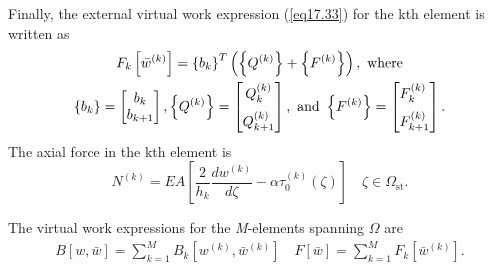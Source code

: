 \documentclass{AeroStructure-ERJohnson}
\begin{document}
Finally, the external virtual work expression (\ref{eq17.33}) for the kth element is written as
\begin{gather}
F_{k}\left[\bar{w}^{(k)}\right]=\left\{b_{k}\right\}^{T}\left(\left\{Q^{(k)}\right\}+\left\{F^{(k)}\right\}\right), \textrm{ where}\label{eq17.36} \\
\left\{b_{k}\right\}=\left[\begin{array}{@{}c@{}}b_{k} \\b_{k+1}\end{array}\right], \left\{Q^{(k)}\right\}=\left[\begin{array}{@{}c@{}}Q_{k}^{(k)} \\[6pt] Q_{k+1}^{(k)}\end{array}\right], \textrm{ and } \left\{F^{(k)}\right\}=\left[\begin{array}{@{}l@{}}F_{k}^{(k)} \\[6pt] F_{k+1}^{(k)}\end{array}\right]. \label{eq17.37}
\end{gather}
The axial force in the kth element is
\begin{equation}
N^{(k)}=E A\left[\frac{2}{h_{k}} \frac{d w^{(k)}}{d \zeta}-\alpha \tau_{0}^{(k)}(\zeta)\right] \quad \zeta \in \Omega_{\mathrm{st}}. \label{eq17.38}
\end{equation}

\vspace*{-1pc}

The virtual work expressions for the \textit{M}-elements spanning $\Omega$ are
\begin{align}\label{eq17.39}
B[w, \bar{w}]=\sum_{k=1}^{M} B_{k}\left[w^{(k)}, \bar{w}^{(k)}\right] \quad F[\bar{w}]=\sum_{k=1}^{M} F_{k}\left[\bar{w}^{(k)}\right].
\end{align}

\vspace*{-1pc}\pagebreak
\end{document}
